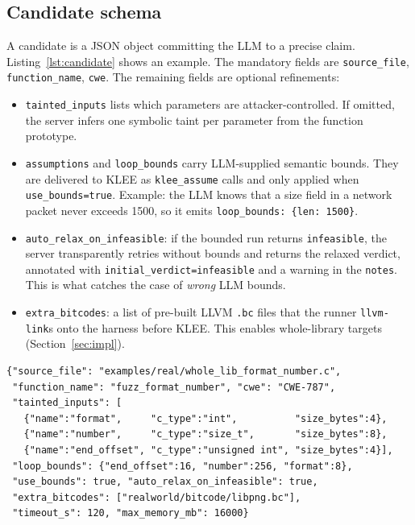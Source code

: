 \documentclass[3p,times,procedia]{elsarticle}
\begin{document}
\subsection{Candidate schema}
\label{sec:schema}

A candidate is a JSON object committing the LLM to a precise claim. Listing~\ref{lst:candidate} shows an example. The mandatory fields are \texttt{source\_file}, \texttt{function\_name}, \texttt{cwe}. The remaining fields are optional refinements:

\begin{itemize}
    \item \texttt{tainted\_inputs} lists which parameters are attacker-controlled. If omitted, the server infers one symbolic taint per parameter from the function prototype.
    \item \texttt{assumptions} and \texttt{loop\_bounds} carry LLM-supplied semantic bounds. They are delivered to KLEE as \texttt{klee\_assume} calls and only applied when \texttt{use\_bounds=true}. Example: the LLM knows that a size field in a network packet never exceeds 1500, so it emits \texttt{loop\_bounds: \{len: 1500\}}.
    \item \texttt{auto\_relax\_on\_infeasible}: if the bounded run returns \texttt{infeasible}, the server transparently retries without bounds and returns the relaxed verdict, annotated with \texttt{initial\_verdict=infeasible} and a warning in the \texttt{notes}. This is what catches the case of \emph{wrong} LLM bounds.
    \item \texttt{extra\_bitcodes}: a list of pre-built LLVM \texttt{.bc} files that the runner \texttt{llvm-link}s onto the harness before KLEE. This enables whole-library targets (Section~\ref{sec:impl}).
\end{itemize}

\begin{lstlisting}[style=jsoncode, caption={Candidate JSON for the libpng \texttt{png\_format\_number} OOB write.}, label={lst:candidate}]
{"source_file": "examples/real/whole_lib_format_number.c",
 "function_name": "fuzz_format_number", "cwe": "CWE-787",
 "tainted_inputs": [
   {"name":"format",     "c_type":"int",          "size_bytes":4},
   {"name":"number",     "c_type":"size_t",       "size_bytes":8},
   {"name":"end_offset", "c_type":"unsigned int", "size_bytes":4}],
 "loop_bounds": {"end_offset":16, "number":256, "format":8},
 "use_bounds": true, "auto_relax_on_infeasible": true,
 "extra_bitcodes": ["realworld/bitcode/libpng.bc"],
 "timeout_s": 120, "max_memory_mb": 16000}
\end{lstlisting}
\end{document}
